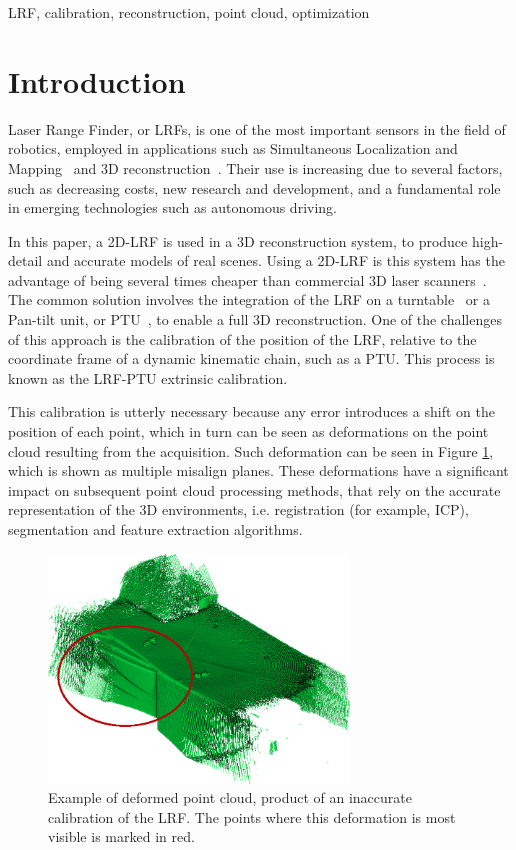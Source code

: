 \documentclass[conference]{IEEEtran}
\begin{document}
\begin{IEEEkeywords}
LRF, calibration, reconstruction, point cloud, optimization
\end{IEEEkeywords}

\section{Introduction}\label{section:introduction}

Laser Range Finder, or LRFs, is one of the most important sensors in the field of robotics, employed in applications such as Simultaneous Localization and Mapping~\cite{cadena16} and 3D reconstruction~\cite{saito10}. Their use is increasing due to several factors, such as decreasing costs, new research and development, and a fundamental role in emerging technologies such as autonomous driving.

In this paper, a 2D-LRF is used in a 3D reconstruction system, to produce high-detail and accurate models of real scenes. Using a 2D-LRF is this system has the advantage of being several times cheaper than commercial 3D laser scanners~\cite{dias06}. The common solution involves the integration of the LRF on a turntable~\cite{maurelli09} or a Pan-tilt unit, or PTU~\cite{klimentjew09}, to enable a full 3D reconstruction. One of the challenges of this approach is the calibration of the position of the LRF, relative to the coordinate frame of a dynamic kinematic chain, such as a PTU. This process is known as the LRF-PTU extrinsic calibration.

This calibration is utterly necessary because any error introduces a shift on the position of each point, which in turn can be seen as deformations on the point cloud resulting from the acquisition. Such deformation can be seen in Figure \ref{fig:deformed-pointcloud}, which is shown as multiple misalign planes. These deformations have a significant impact on subsequent point cloud processing methods, that rely on the accurate representation of the 3D environments, i.e. registration (for example, ICP), segmentation and feature extraction algorithms. 

\begin{figure}[h]
    \centering
    \includegraphics[width=8cm]{images/bad-pointcloud.png}
    \caption{Example of deformed point cloud, product of an inaccurate calibration of the LRF. The points where this deformation is most visible is marked in red.}
    \label{fig:deformed-pointcloud}
\end{figure}
\end{document}
